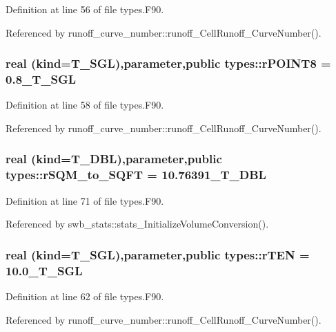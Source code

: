 Definition at line 56 of file types.F90.



Referenced by runoff\_\-curve\_\-number::runoff\_\-CellRunoff\_\-CurveNumber().

\hypertarget{namespacetypes_a3d2ba56f06a1f0b74066c51ebcfe3454}{
\subsubsection[{rPOINT8}]{\setlength{\rightskip}{0pt plus 5cm}real (kind={\bf T\_\-SGL}),parameter,public {\bf types::rPOINT8} = 0.8\_\-T\_\-SGL}}
\label{namespacetypes_a3d2ba56f06a1f0b74066c51ebcfe3454}


Definition at line 58 of file types.F90.



Referenced by runoff\_\-curve\_\-number::runoff\_\-CellRunoff\_\-CurveNumber().

\hypertarget{namespacetypes_a2f2f871f373ad3176f43993fc23103a5}{
\subsubsection[{rSQM\_\-to\_\-SQFT}]{\setlength{\rightskip}{0pt plus 5cm}real (kind={\bf T\_\-DBL}),parameter,public {\bf types::rSQM\_\-to\_\-SQFT} = 10.76391\_\-T\_\-DBL}}
\label{namespacetypes_a2f2f871f373ad3176f43993fc23103a5}


Definition at line 71 of file types.F90.



Referenced by swb\_\-stats::stats\_\-InitializeVolumeConversion().

\hypertarget{namespacetypes_ad2b16166ee54c6521c92846ca1867905}{
\subsubsection[{rTEN}]{\setlength{\rightskip}{0pt plus 5cm}real (kind={\bf T\_\-SGL}),parameter,public {\bf types::rTEN} = 10.0\_\-T\_\-SGL}}
\label{namespacetypes_ad2b16166ee54c6521c92846ca1867905}


Definition at line 62 of file types.F90.



Referenced by runoff\_\-curve\_\-number::runoff\_\-CellRunoff\_\-CurveNumber().


